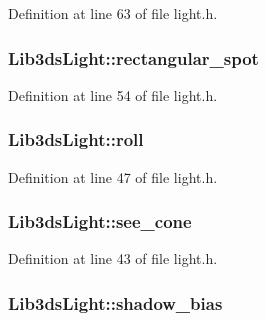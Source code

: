 Definition at line 63 of file light.\-h.

\hypertarget{struct_lib3ds_light_a26d2809feacd3c9ba660224d5c7d51af}{
\subsubsection[{rectangular\-\_\-spot}]{ Lib3ds\-Light\-::rectangular\-\_\-spot}}\label{struct_lib3ds_light_a26d2809feacd3c9ba660224d5c7d51af}


Definition at line 54 of file light.\-h.

\hypertarget{struct_lib3ds_light_a7827c90ab522991f41f7afbfbcbf03c9}{
\subsubsection[{roll}]{ Lib3ds\-Light\-::roll}}\label{struct_lib3ds_light_a7827c90ab522991f41f7afbfbcbf03c9}


Definition at line 47 of file light.\-h.

\hypertarget{struct_lib3ds_light_a46465e5e804db0a2e4ee63c544eb1d2c}{
\subsubsection[{see\-\_\-cone}]{ Lib3ds\-Light\-::see\-\_\-cone}}\label{struct_lib3ds_light_a46465e5e804db0a2e4ee63c544eb1d2c}


Definition at line 43 of file light.\-h.

\hypertarget{struct_lib3ds_light_ac63f7d2d8b24a8d1809dff8d3e897f38}{
\subsubsection[{shadow\-\_\-bias}]{ Lib3ds\-Light\-::shadow\-\_\-bias}}\label{struct_lib3ds_light_ac63f7d2d8b24a8d1809dff8d3e897f38}


